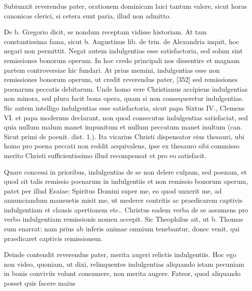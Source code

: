 Subiunxit reverendus pater, orationem dominicam laici tantum valere, sicut horas canonicas clerici, si cetera sunt paria, illud non admitto.

De b. Gregorio dicit, se nondum receptam vidisse historiam. At tam constantissima fama, sicut b. Augustinus lib. de trin. de Alexandria inquit, hoc negari non permittit. Negat autem indulgentias esse satisfactoria, sed solum sint remissiones bonorum operum. In hoc credo principali nos dissentire et magnam partem controversiae hic fundari. At prius memini, indulgentias esse non remissiones bonorum operum, ut credit reverendus pater, [352] sed remissiones poenarum peccatis debitarum. Unde homo vere Christianus accipiens indulgentias non minora, sed plura facit bona opera, quam si non consequeretur indulgentias. Sic autem intelligo indulgentias esse satisfactoria, sicut papa Sixtus IV., Clemens VI. et papa modernus declarant, non quod consecutus indulgentias satisfaciat, sed quia nullum malum manet impunitum et nullum peccatum manet inultum (can. Sicut primi de poenit. dist. 1.). Ita vicarius Christi dispensator eius thesauri, ubi homo pro poena peccati non reddit aequivalens, ipse ex thesauro sibi commisso merito Christi sufficientissimo illud recompensat et pro eo satisfacit.

Quare concessi in prioribus, indulgentias de se non delere culpam, sed poenam, et quod sit talis remissio poenarum in indulgentiis et non remissio bonorum operum, patet per illud Esaiae: Spiritus Domini super me, eo quod unxerit me, ad annunciandum mansuetis misit me, ut mederer contritis ac praedicarem captivis indulgentiam et clausis apertionem etc.. Christus eadem verba de se assumens pro verbo indulgentiam remissionis nomen accepit. Sic Theophilus ait, ut b. Thomas eum enarrat: nam prius ab inferis animae omnium tenebantur, donec venit, qui praedicaret captivis remissionem.

Deinde contendit reverendus pater, merita augeri relictis indulgentiis. Hoc ego non video, quoniam, ut dixi, relinquentes indulgentias aliquando istam pecuniam in bonis conviviis volunt consumere, non merita augere. Fateor, quod aliquando posset quis facere maius

